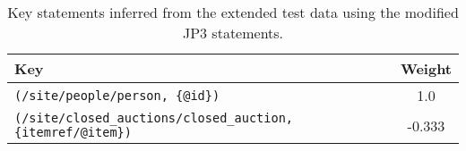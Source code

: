 \begin{table}
\begin{tabular}{|l|c|}
\hline
\textbf{Key} & \textbf{Weight} \\ \hline \hline
\texttt{(/site/people/person, \{@id\})} & 1.0 \\ \hline
\texttt{(/site/closed\_auctions/closed\_auction, \{itemref/@item\})} & -0.333 \\ \hline
\end{tabular}
\caption[Key statements inferred using the modified JP3 statements.]{Key statements inferred from the extended test data using the modified JP3 statements.}
\label{TAB_inferred_keys_3}
\end{table}

